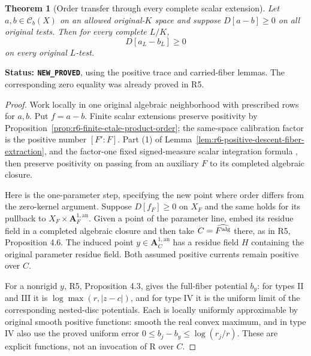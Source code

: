 \documentclass[11pt,a4paper]{article}
\numberwithin{equation}{section}
\newtheorem{theorem}{Theorem}[section]
\theoremstyle{definition}
\theoremstyle{remark}
\newcommand{\an}{\mathrm{an}}
\begin{document}
\begin{theorem}[Order transfer through every complete scalar extension]
\label{thm:r6-all-complete-scalar-order}
Let $a,b\in\mathcal C_b(X)$ on an allowed original-$K$ space
and suppose $D[a-b]\geq0$ on all original tests. Then for every
complete $L/K$,
\[
                              D[a_L-b_L]\geq0
\]
on every original $L$-test.
\end{theorem}

\noindent\textbf{Status: \texttt{NEW\_PROVED}}, using the
positive trace and carried-fiber lemmas. The corresponding zero
equality was already proved in R5.

\begin{proof}
Work locally in one original algebraic neighborhood with prescribed
rows for $a,b$. Put $f=a-b$. Finite scalar extensions preserve
positivity by Proposition~\ref{prop:r6-finite-etale-product-order};
the same-space calibration factor is the positive number $[F':F]$.
Part (1) of Lemma~\ref{lem:r6-positive-descent-fiber-extraction},
and the factor-one fixed signed-measure scalar integration formula
\cite[Proposition 15.3.1]{CLD25}, then preserve positivity on
passing from an auxiliary $F$ to its completed algebraic closure.

Here is the one-parameter step, specifying the new point where order
differs from the zero-kernel argument. Suppose $D[f_F]\geq0$ on
$X_F$ and the same holds for its pullback to
$X_F\times\mathbf A_F^{1,\an}$. Given a point of the parameter
line, embed its residue field in a completed algebraic closure and
then take $C=\widehat{F^{\rm alg}}$ there, as in R5,
Proposition 4.6. The induced point $y\in\mathbf A_C^{1,\an}$
has a residue field $H$ containing the original parameter residue
field. Both assumed positive currents remain positive over $C$.

For a nonrigid $y$, R5, Proposition 4.3, gives the full-fiber
potential $b_y$: for types II and III it is
$\log\max(r,|z-c|)$, and for type IV it is the uniform limit of
the corresponding nested-disc potentials. Each is locally uniformly
approximable by original smooth positive functions: smooth the real
convex maximum, and in type IV also use the proved uniform error
$0\leq b_j-b_y\leq\log(r_j/r)$. These are explicit functions,
not an invocation of R over $C$.


\end{proof}
\end{document}
